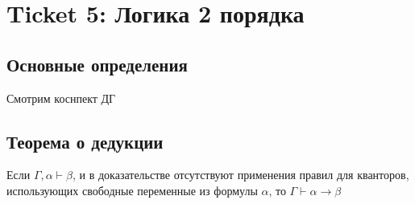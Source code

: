 \section{Ticket 5: Логика 2 порядка}
\subsection{Основные определения}
Смотрим коснпект ДГ
\subsection{Теорема о дедукции}
\begin{theorem}
Если $\Gamma, \alpha \vdash \beta$, и в доказательстве отсутствуют применения правил для кванторов, использующих свободные переменные  из формулы $\alpha$, то $\Gamma \vdash \alpha \rightarrow \beta$
\end{theorem}
